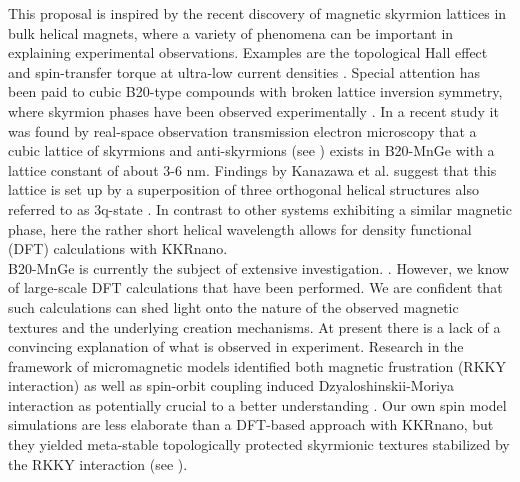 \documentclass [a4paper, 12pt]{article}
\begin{document}
This proposal is inspired by the recent discovery of magnetic skyrmion lattices in bulk helical magnets,
where a variety of phenomena can be important in explaining experimental observations.
Examples are the topological Hall effect and spin-transfer torque at ultra-low current densities
\cite{kanazawa_large_2011}.
Special attention has been paid to cubic B20-type compounds with broken lattice inversion symmetry,
where skyrmion phases have been observed experimentally
\cite{nagaosa_topological_2013}.
In a recent study \cite{tanigaki_real-space_2015} 
it was found by real-space observation transmission electron microscopy 
that a cubic lattice of skyrmions and anti-skyrmions (see ) exists in B20-MnGe with
a lattice constant of about 3-6 nm. Findings by Kanazawa et al. suggest that this
lattice is set up by a superposition of three orthogonal helical
structures also referred to as 3q-state \cite{kanazawa_noncentrosymmetric_2017}.
In contrast to other systems exhibiting a similar magnetic phase,
here the rather short helical wavelength allows for density functional (DFT) calculations
with KKRnano. 
\\
B20-MnGe is currently the subject of extensive investigation.
\cite{kanazawa_large_2011,kanazawa_possible_2012,grigoriev_chiral_2013,tanigaki_real-space_2015,
martin_magnetic_2016}.
However, we know of large-scale DFT calculations that have been performed.
We are confident that such calculations can shed light onto the nature of
the observed magnetic textures and the underlying creation mechanisms.
At present there is a lack of a convincing explanation of what is observed in experiment. 
Research in the framework of micromagnetic models identified both magnetic frustration (RKKY interaction) 
as well as spin-orbit coupling induced Dzyaloshinskii-Moriya interaction as potentially
crucial to a better understanding \cite{altynbaev_hidden_2016,koretsune_control_2015}.
Our own spin model simulations are less elaborate than a DFT-based approach with KKRnano, but they
yielded meta-stable
topologically protected skyrmionic textures \cite{bornemann_investigation_2017} stabilized by the RKKY interaction
(see ).
\end{document}
